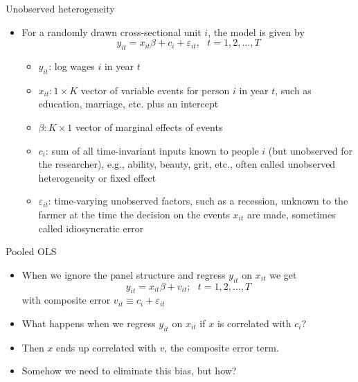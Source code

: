 \documentclass{beamer}
\begin{document}
\begin{frame}{Unobserved heterogeneity}

	
	\begin{itemize}
	\item For a randomly drawn cross-sectional unit $i$, the model is given by $$y_{it} = x_{it}\beta + c_i + \varepsilon_{it}, \text{   }t=1,2,\dots,T$$
		\begin{itemize}
		\item $y_{it}$: log wages $i$ in year $t$
		\item $x_{it}:1 \times K$ vector of variable events for person $i$ in year $t$, such as education, marriage, etc. plus an intercept
		\item $\beta: K\times 1$ vector of marginal effects of events
		\item $c_i$: sum of all time-invariant inputs known to people $i$ (but unobserved for the researcher), e.g., ability, beauty, grit, etc., often called unobserved heterogeneity or fixed effect
		\item $\varepsilon_{it}$: time-varying unobserved factors, such as a recession, unknown to the farmer at the time the decision on the events $x_{it}$ are made, sometimes called idiosyncratic error
		\end{itemize}
	\end{itemize}
\end{frame}


\begin{frame}{Pooled OLS}

\begin{itemize}
	\item When we ignore the panel structure and regress $y_{it}$ on $x_{it}$ we get$$ y_{it}=x_{it}\beta + v_{it}; \text{    }t=1,2,\dots,T$$with composite error $v_{it} \equiv c_i + \varepsilon_{it}$
	\item What happens when we regress $y_{it}$ on $x_{it}$ if $x$ is correlated with $c_i$?
	\item Then $x$ ends up correlated with $v$, the composite error term.
	\item Somehow we need to eliminate this bias, but how?
\end{itemize}

\end{frame}
\end{document}
